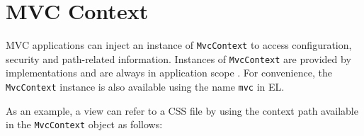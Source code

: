 \section{MVC Context}
\label{mvc_context}

MVC applications can inject an instance of {\tt MvcContext} to access configuration,
security and path-related information. Instances of {\tt MvcContext} are provided
by implementations and are always in application scope . 
For convenience, the
{\tt MvcContext} instance is also available using the name {\tt mvc} in EL.

As an example, a view can refer to a CSS file by using the context path available in 
the {\tt MvcContext} object as follows:








